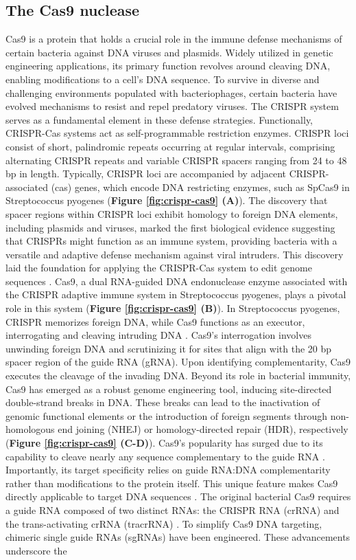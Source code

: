 \documentclass[a4paper, titlepage, openright]{book}
\begin{document}
\subsection{The Cas9 nuclease}
Cas9 is a protein that holds a crucial role in the immune defense mechanisms of certain bacteria against DNA viruses and plasmids. Widely utilized in genetic engineering applications, its primary function revolves around cleaving DNA, enabling modifications to a cell's DNA sequence. To survive in diverse and challenging environments populated with bacteriophages, certain bacteria have evolved mechanisms to resist and repel predatory viruses. The CRISPR system serves as a fundamental element in these defense strategies. Functionally, CRISPR-Cas systems act as self-programmable restriction enzymes. CRISPR loci consist of short, palindromic repeats occurring at regular intervals, comprising alternating CRISPR repeats and variable CRISPR spacers ranging from 24 to 48 bp in length. Typically, CRISPR loci are accompanied by adjacent CRISPR-associated (cas) genes, which encode DNA restricting enzymes, such as SpCas9 in Streptococcus pyogenes (\textbf{Figure \ref{fig:crispr-cas9} (A)}). The discovery that spacer regions within CRISPR loci exhibit homology to foreign DNA elements, including plasmids and viruses, marked the first biological evidence suggesting that CRISPRs might function as an immune system, providing bacteria with a versatile and adaptive defense mechanism against viral intruders. This discovery laid the foundation for applying the CRISPR-Cas system to edit genome sequences \citep{mali2013cas9}. Cas9, a dual RNA-guided DNA endonuclease enzyme associated with the CRISPR adaptive immune system in Streptococcus pyogenes, plays a pivotal role in this system (\textbf{Figure \ref{fig:crispr-cas9} (B)}). In Streptococcus pyogenes, CRISPR memorizes foreign DNA, while Cas9 functions as an executor, interrogating and cleaving intruding DNA \citep{garneau2010crispr,jinek2012programmable,heler2015cas9}. Cas9's interrogation involves unwinding foreign DNA and scrutinizing it for sites that align with the 20 bp spacer region of the guide RNA (gRNA). Upon identifying complementarity, Cas9 executes the cleavage of the invading DNA. Beyond its role in bacterial immunity, Cas9 has emerged as a robust genome engineering tool, inducing site-directed double-strand breaks in DNA. These breaks can lead to the inactivation of genomic functional elements or the introduction of foreign segments through non-homologous end joining (NHEJ) or homology-directed repair (HDR), respectively (\textbf{Figure \ref{fig:crispr-cas9} (C-D)}). Cas9's popularity has surged due to its capability to cleave nearly any sequence complementary to the guide RNA \citep{jinek2012programmable}. Importantly, its target specificity relies on guide RNA:DNA complementarity rather than modifications to the protein itself. This unique feature makes Cas9 directly applicable to target DNA sequences \citep{mali2013cas9}. The original bacterial Cas9 requires a guide RNA composed of two distinct RNAs: the CRISPR RNA (crRNA) and the trans-activating crRNA (tracrRNA) \citep{deltcheva2011crispr}. To simplify Cas9 DNA targeting, chimeric single guide RNAs (sgRNAs) have been engineered. These advancements underscore the 
\end{document}

